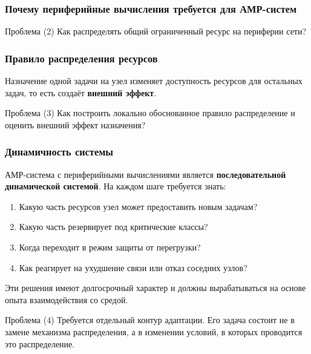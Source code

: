 \begin{frame}
    \frametitle{Почему периферийные вычисления требуется для АМР-систем}
    \begin{center}
    \end{center}
   \small
    \begin{block}{Проблема (2)}
	Как распределять общий ограниченный ресурс на периферии сети?
    \end{block}
\end{frame}

\begin{frame}
	\frametitle{Правило распределения ресурсов}
	\small
	Назначение одной задачи на узел изменяет доступность ресурсов для остальных задач, то есть создаёт \textbf{внешний эффект}.
	\begin{center}
	\end{center}
	\begin{block}{Проблема (3)}
		Как построить локально обоснованное правило распределение и оценить внешний эффект назначения?
	\end{block}
\end{frame}

\begin{frame}
	\frametitle{Динамичность системы}
	АМР-система с периферийными вычислениями является \textbf{последовательной динамической системой}. На каждом шаге требуется знать:
	\begin{enumerate}
		\item Какую часть ресурсов узел может предоставить новым задачам?
		\item Какую часть резервирует под критические классы?
		\item Когда переходит в режим защиты от перегрузки?
		\item Как реагирует на ухудшение связи или отказ соседних узлов?
	\end{enumerate}
	Эти решения имеют долгосрочный характер и должны вырабатываться на основе опыта взаимодействия со средой.
	\small
	\begin{block}{Проблема (4)}
		Требуется отдельный контур адаптации. Его задача состоит не в замене механизма распределения, а в изменении условий, в которых проводится это распределение.
	\end{block}
\end{frame}

